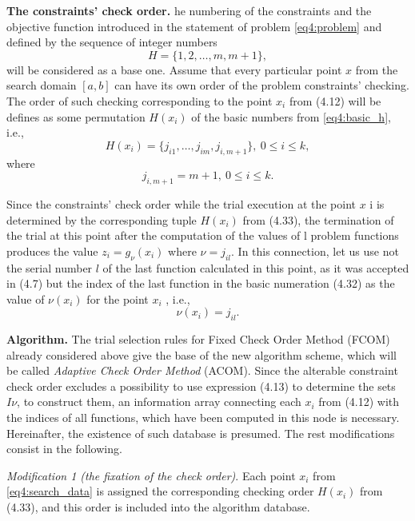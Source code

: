 \textbf{The constraints’ check order.} he numbering of the constraints and the objective function introduced in the statement of problem \eqref{eq4:problem} and defined by the sequence of integer numbers
\begin{equation}
  \label{eq4:basic_h}
  H=\{1,2,\dots,m,m+1\},
\end{equation}
will be considered as a base one.
Assume that every particular point $x$ from the search domain $[a,b]$ can have its own order of the problem constraints’ checking. The order of such checking corresponding to the point $x_i$ from (4.12) will be defines as some permutation $H(x_i )$ of the basic numbers from \eqref{eq4:basic_h}, i.e.,
\begin{equation}
  H(x_i)=\{j_{i1},\dots,j_{im},j_{i,m+1}\},\:0\le i\le k,
\end{equation}
where
\begin{equation}
  j_{i,m+1}=m+1,\:0\le i\le k.
\end{equation}

Since the constraints’ check order while the trial execution at the point $x$ i is determined by the corresponding tuple $H(x_i )$ from (4.33), the termination of the trial at this point after the computation of the values of l problem functions produces the value $z_i=g_\nu(x_i)$ where $\nu=j_{il}$. In this connection, let us use not the serial number $l$ of the last function calculated in this point, as it was accepted in (4.7) but the index of the last function in the basic numeration (4.32) as the
value of $\nu(x_i )$ for the point $x_i$ , i.e.,
\begin{equation}
  \nu(x_i)=j_{il}.
\end{equation}

\textbf{Algorithm.} The trial selection rules for Fixed Check Order Method (FCOM) already considered above give the base of the new algorithm scheme, which will be called \emph{Adaptive
Check Order Method} (ACOM). Since the alterable constraint check order excludes a possibility to use expression (4.13) to determine the sets $I\nu$, to construct them, an information array connecting each $x_i$ from (4.12) with the indices of all functions, which have been computed in this node is necessary. Hereinafter, the existence of such database is presumed. The rest modifications consist in the following.

\emph{Modification 1 (the fixation of the check order)}. Each point $x_i$ from \eqref{eq4:search_data} is assigned the corresponding checking order $H(x_i )$ from (4.33), and this order is included into the algorithm database.


